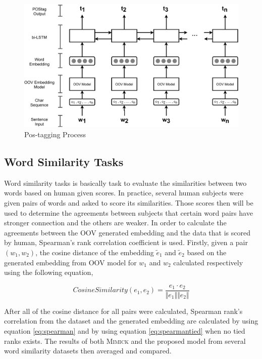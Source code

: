         \begin{figure}
            \centering
            \includegraphics[width=.8\linewidth]{images/postag.pdf}
            \caption{Pos-tagging Process}
            \label{fig:postag}
        \end{figure}
 
    \subsection{Word Similarity Tasks}
        Word similarity tasks is basically task to evaluate the
        similarities between two words based on human given scores. In
        practice, several human subjects were given pairs of words and
        asked to score its similarities. Those scores then will be
        used to determine the agreements between subjects that certain
        word pairs have stronger connection and the others are weaker.
        In order to calculate the agreements between the OOV generated
        embedding and the data that is scored by human, Spearman's
        rank correlation coefficient is used. Firstly, given a pair
        $(w_1, w_2)$, the cosine distance of the embedding
        $\tilde{e}_1$ and $\tilde{e}_2$ based on the generated
        embedding from OOV model for $w_1$ and $w_2$ calculated
        respectively using the following equation,

        \begin{equation}
            \label{eq:cosinesim}
            CosineSimilarity(e_1, e_2) = \frac{e_1 \cdot e_2}{\Vert e_1 \Vert \Vert e_2 \Vert}
        \end{equation}

        After all of the cosine distance for all pairs were calculated,
        Spearman rank's correlation from the dataset and the generated
        embedding are calculated by using equation \ref{eq:spearman}
        and by using equation \ref{eq:spearmantied} when no tied ranks
        exists. The results of both \textsc{Mimick} and the proposed
        model from several word similarity datasets then averaged and
        compared.
        
